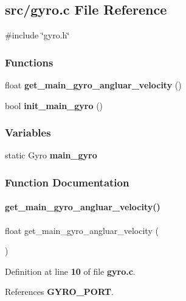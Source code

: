 \subsection{src/gyro.c File Reference}
\label{gyro_8c}
{\ttfamily \#include \char`\"{}gyro.\+h\char`\"{}}\newline
\subsubsection*{Functions}
\begin{DoxyCompactItemize}
\item 
float \textbf{ get\+\_\+main\+\_\+gyro\+\_\+angluar\+\_\+velocity} ()
\item 
bool \textbf{ init\+\_\+main\+\_\+gyro} ()
\end{DoxyCompactItemize}
\subsubsection*{Variables}
\begin{DoxyCompactItemize}
\item 
static Gyro \textbf{ main\+\_\+gyro}
\end{DoxyCompactItemize}


\subsubsection{Function Documentation}
\mbox{\label{gyro_8c_aec0963ebe3eb6cdfd7edaf486bbb0a87}} 
\paragraph{get\+\_\+main\+\_\+gyro\+\_\+angluar\+\_\+velocity()}
{\footnotesize\ttfamily float get\+\_\+main\+\_\+gyro\+\_\+angluar\+\_\+velocity (\begin{DoxyParamCaption}{ }\end{DoxyParamCaption})}



Definition at line \textbf{ 10} of file \textbf{ gyro.\+c}.



References \textbf{ G\+Y\+R\+O\+\_\+\+P\+O\+RT}.

\mbox{\label{gyro_8c_a47c0a78a867be91a28e278bf433d699c}} 
